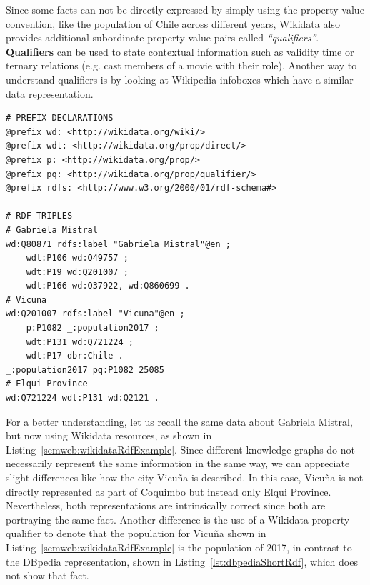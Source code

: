 Since some facts can not be directly expressed by simply using the property-value convention, 
like the population of Chile across different years, Wikidata also provides additional 
subordinate property-value pairs called \textit{“qualifiers”}. \textbf{Qualifiers} can be used 
to state contextual information such as validity time or ternary relations (e.g. cast members of 
a movie with their role). Another way to understand qualifiers is by looking at Wikipedia 
infoboxes which have a similar data representation.

\begin{lstlisting}[captionpos=b, 
    caption=Set of RDF triples about Gabriela Mistral in Wikidata., 
    label=semweb:wikidataRdfExample,
    basicstyle=\ttfamily,frame=single]
# PREFIX DECLARATIONS
@prefix wd: <http://wikidata.org/wiki/>
@prefix wdt: <http://wikidata.org/prop/direct/>
@prefix p: <http://wikidata.org/prop/>
@prefix pq: <http://wikidata.org/prop/qualifier/>
@prefix rdfs: <http://www.w3.org/2000/01/rdf-schema#>

# RDF TRIPLES
# Gabriela Mistral
wd:Q80871 rdfs:label "Gabriela Mistral"@en ;
    wdt:P106 wd:Q49757 ;
    wdt:P19 wd:Q201007 ;
    wdt:P166 wd:Q37922, wd:Q860699 .
# Vicuna
wd:Q201007 rdfs:label "Vicuna"@en ;
    p:P1082 _:population2017 ;
    wdt:P131 wd:Q721224 ;
    wdt:P17 dbr:Chile .
_:population2017 pq:P1082 25085
# Elqui Province
wd:Q721224 wdt:P131 wd:Q2121 .
\end{lstlisting}

For a better understanding, let us recall the same data about Gabriela Mistral, but now using 
Wikidata resources, as shown in Listing~\ref{semweb:wikidataRdfExample}. Since different knowledge 
graphs do not necessarily represent the same information in the same way, we can appreciate slight 
differences like how the city Vicuña is described. In this case, Vicuña is not directly represented 
as part of Coquimbo but instead only Elqui Province. Nevertheless, both representations are 
intrinsically correct since both are portraying the same fact. Another difference is the use of 
a Wikidata property qualifier to denote that the population for Vicuña shown in 
Listing~\ref{semweb:wikidataRdfExample} is the population of 2017, in contrast to the DBpedia 
representation, shown in Listing~\ref{lst:dbpediaShortRdf}, which does not show that fact.


